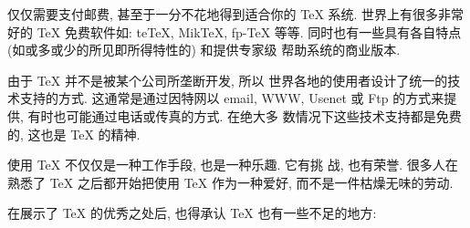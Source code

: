 \begin{description}
       仅仅需要支付邮费, 甚至于一分不花地得到适合你的 \TeX{} \index{\TeX} 系统.
       世界上有很多非常好的 \TeX{} \index{\TeX} 免费软件如: teTeX, MikTeX, fp-TeX
       等等. 同时也有一些具有各自特点 (如或多或少的所见即所得特性的) 和提供专家级
       帮助系统的商业版本.
  \item[超级技术支持] 由于 \TeX{} \index{\TeX} 并不是被某个公司所垄断开发, 所以
       世界各地的使用者设计了统一的技术支持的方式. 这通常是通过因特网以 email,
       WWW, Usenet 或 Ftp 的方式来提供, 有时也可能通过电话或传真的方式. 在绝大多
       数情况下这些技术支持都是免费的, 这也是 \TeX{} \index{\TeX} 的精神.
  \item[\TeX{} 是一种乐趣] 使用 \TeX{} \index{\TeX} 不仅仅是一种工作手段, 也是一种乐趣.  它有挑
       战, 也有荣誉. 很多人在熟悉了 \TeX{} \index{\TeX} 之后都开始把使用 \TeX{} \index{\TeX} 作为一种爱好,
       而不是一件枯燥无味的劳动.
\end{description}


在展示了 \TeX{}\index{\TeX} 的优秀之处后, 也得承认 \TeX{}\index{\TeX} 也有一些不足的地方:

